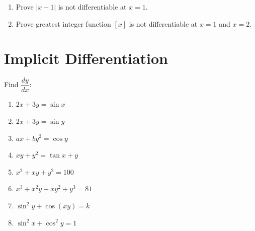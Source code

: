 \documentclass[12pt,a4paper]{article}
\begin{document}
\begin{enumerate}
\item Prove $|x-1|$ is not differentiable at $x=1$.
\item Prove greatest integer function $[x]$ is not differentiable at $x=1$ and $x=2$.
\end{enumerate}

\section*{Implicit Differentiation}

Find $\dfrac{dy}{dx}$:

\begin{enumerate}
\item $2x+3y=\sin x$
\item $2x+3y=\sin y$
\item $ax+by^2=\cos y$
\item $xy+y^2=\tan x+y$
\item $x^2+xy+y^2=100$
\item $x^3+x^2y+xy^2+y^3=81$
\item $\sin^2 y+\cos(xy)=k$
\item $\sin^2 x+\cos^2 y=1$
\end{enumerate}
\end{document}
